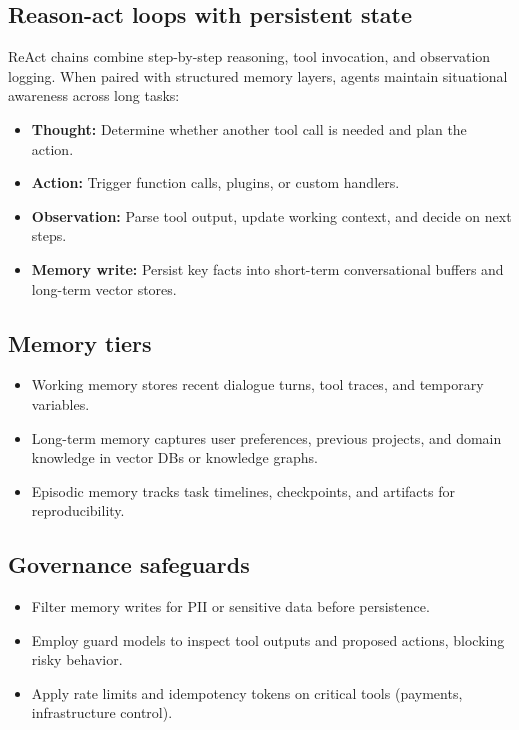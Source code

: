 \documentclass{article}
\begin{document}
\subsection{Reason-act loops with persistent state}
ReAct chains combine step-by-step reasoning, tool invocation, and observation logging. When paired with structured memory layers, agents maintain situational awareness across long tasks:
\begin{itemize}
  \item \textbf{Thought:} Determine whether another tool call is needed and plan the action.
  \item \textbf{Action:} Trigger function calls, plugins, or custom handlers.
  \item \textbf{Observation:} Parse tool output, update working context, and decide on next steps.
  \item \textbf{Memory write:} Persist key facts into short-term conversational buffers and long-term vector stores.
\end{itemize}

\subsection{Memory tiers}
\begin{itemize}
  \item Working memory stores recent dialogue turns, tool traces, and temporary variables.
  \item Long-term memory captures user preferences, previous projects, and domain knowledge in vector DBs or knowledge graphs.
  \item Episodic memory tracks task timelines, checkpoints, and artifacts for reproducibility.
\end{itemize}

\subsection{Governance safeguards}
\begin{itemize}
  \item Filter memory writes for PII or sensitive data before persistence.
  \item Employ guard models to inspect tool outputs and proposed actions, blocking risky behavior.
  \item Apply rate limits and idempotency tokens on critical tools (payments, infrastructure control).
\end{itemize}
\end{document}
